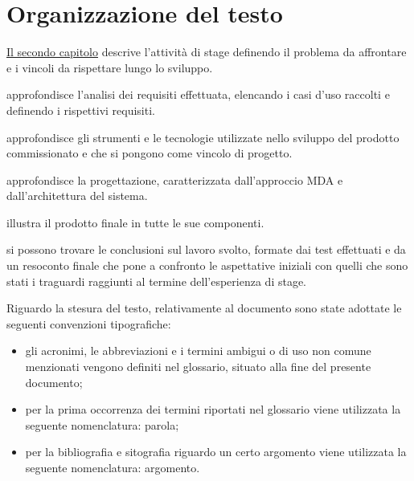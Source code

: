 \pagebreak

\section{Organizzazione del testo}

{\hyperref[cap:descrizione-stage]{Il secondo capitolo}} descrive l'attività di stage definendo il problema da affrontare e i vincoli da rispettare lungo lo sviluppo.
    
 approfondisce l'analisi dei requisiti effettuata, elencando i casi d'uso raccolti e definendo i rispettivi requisiti.
    
 approfondisce gli strumenti e le tecnologie utilizzate nello sviluppo del prodotto commissionato e che si pongono come vincolo di progetto.
    
 approfondisce la progettazione, caratterizzata dall'approccio MDA e dall'architettura del sistema.
    
 illustra il prodotto finale in tutte le sue componenti.
    
 si possono trovare le conclusioni sul lavoro svolto, formate dai test effettuati e da un resoconto finale che pone a confronto le aspettative iniziali con quelli che sono stati i traguardi raggiunti al termine dell'esperienza di stage.

\noindent Riguardo la stesura del testo, relativamente al documento sono state adottate le seguenti convenzioni tipografiche:
\begin{itemize}
	\item gli acronimi, le abbreviazioni e i termini ambigui o di uso non comune menzionati vengono definiti nel glossario, situato alla fine del presente documento;
	\item per la prima occorrenza dei termini riportati nel glossario viene utilizzata la seguente nomenclatura: parola\glsfirstoccur;
	\item per la bibliografia e sitografia riguardo un certo argomento viene utilizzata la seguente nomenclatura:  argomento\ap{{[b]}}.
\end{itemize}
